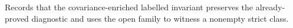 Records that the covariance-enriched labelled invariant preserves the already-proved diagnostic and uses the open family to witness a nonempty strict class.